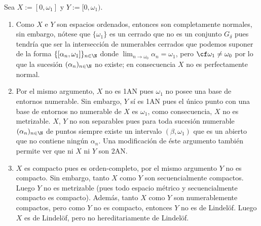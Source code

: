 \documentclass[topologia-analisis.tex]{subfiles}
\begin{document}
\begin{exn}\label{ex:omega_1_ord_space}
	Sea $X := [0, \omega_1]$ y $Y := [0, \omega_1)$.
	\begin{enumerate}
		\item Como $X$ e $Y$ son espacios ordenados, entonces son completamente normales, sin embargo,
			nótese que $\{ \omega_1 \}$ es un cerrado que no es un conjunto $G_\delta$ pues tendría que ser la intersección de numerables cerrados
			que podemos suponer de la forma $\{ [\alpha_n, \omega_1] \}_{n\in\N}$ donde $\lim_{n \to \omega_0} \alpha_n = \omega_1$,
			pero $\cf\omega_1 \ne \omega_0$ por lo que la sucesión $(\alpha_n)_{n\in\N}$ no existe;
			en consecuencia $X$ no es perfectamente normal.

		\item Por el mismo argumento, $X$ no es 1AN pues $\omega_1$ no posee una base de entornos numerable.
			Sin embargo, $Y$ sí es 1AN pues el único punto con una base de entornos no numerable de $X$ es $\omega_1$,
			como consecuencia, $X$ no es metrizable.
			$X$, $Y$ no son separables pues para toda sucesión numerable $(\alpha_n)_{n\in\N}$ de puntos siempre
			existe un intervalo $(\beta, \omega_1)$ que es un abierto que no contiene ningún $\alpha_n$.
			Una modificación de éste argumento también permite ver que ni $X$ ni $Y$ son 2AN.

		\item $X$ es compacto pues es orden-completo, por el mismo argumento $Y$ no es compacto.
			Sin embargo, tanto $X$ como $Y$ son secuencialmente compactos.
			Luego $Y$ no es metrizable (pues todo espacio métrico y secuencialmente compacto es compacto).
			Además, tanto $X$ como $Y$ son numerablemente compactos,
			pero como $Y$ no es compacto, entonces $Y$ no es de Lindelöf.
			Luego $X$ es de Lindelöf, pero no hereditariamente de Lindelöf.
	\end{enumerate}
\end{exn}
\end{document}
